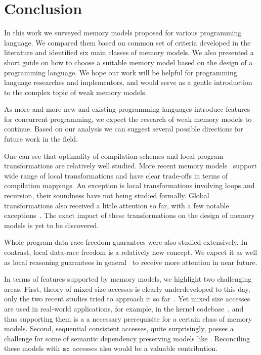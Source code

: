 \section{Conclusion}
\label{sec:conclusion}

In this work we surveyed memory models 
proposed for various programming language. 
We compared them based on common set of criteria
developed in the literature and identified 
six main classes of memory models.
We also presented a short guide on how to 
choose a suitable memory model based on 
the design of a programming language. 
We hope our work will be helpful for 
programming language researches and implementors,
and would serve as a gentle introduction 
to the complex topic of weak memory models. 

As more and more new and existing programming languages 
introduce features for concurrent programming, 
we expect the research of weak memory models to continue.
Based on our analysis we can suggest several
possible directions for future work in the field. 

One can see that optimality of compilation schemes 
and local program transformations are relatively well studied.
More recent memory models~%
\cite{Lahav-al:PLDI17, Dolan-al:PLDI18, Kang-al:POPL17, Chakraborty-Vafeiadis:POPL19} 
support wide range of local transformations and have clear 
trade-offs in terms of compilation mappings. 
An exception is local transformations involving loops and recursion, 
their soundness have not being studied formally. 
Global transformations also received a little attention so far,
with a few notable exceptions~\cite{PichonPharabod-Sewell:POPL16, Lee-al:PLDI20}.
The exact impact of these transformations on the design of 
memory models is yet to be discovered. 

Whole program data-race freedom guarantees were also studied extensively.
In contrast, local data-race freedom is a relatively new concept. 
We expect it as well as local reasoning guarantees 
in general~\cite{Dodds-al:ESOP18, Jagadeesan-al:OOPSLA2020, Cho-al:PLDI21} 
to receive more attention in near future.  

In terms of features supported by memory models, 
we highlight two challenging areas.
First, theory of mixed size accesses is clearly 
underdeveloped to this day, only the two recent studies 
tried to approach it so far~\cite{Flur-al:POPL17, Watt-al:PLDI2020}.
Yet mixed size accesses are used in real-world applications,
for example, in the \Linux kernel codebase~\cite{Flur-al:POPL17},
and thus supporting them is a a necessary prerequisite 
for a certain class of memory models. 
Second, sequential consistent accesses, quite surprisingly,
posses a challenge for some of semantic dependency preserving
models like \Promising. Reconciling these models with ${\mathtt{sc}}$ 
accesses also would be a valuable contribution.

